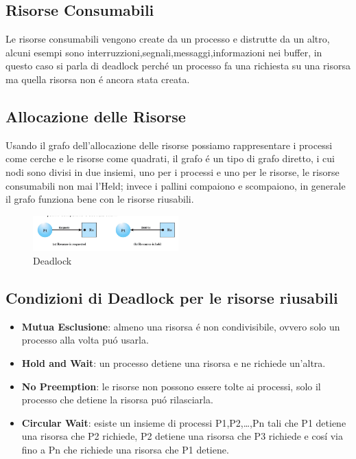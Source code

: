 \subsection{Risorse Consumabili}
Le risorse consumabili vengono create da un processo e distrutte da un altro, alcuni esempi sono interruzzioni,segnali,messaggi,informazioni nei
buffer, in questo caso si parla di deadlock perché un processo fa una richiesta su una risorsa ma quella risorsa non é ancora
stata creata.
\subsection{Allocazione delle Risorse}
Usando il grafo dell'allocazione delle risorse possiamo rappresentare i processi come cerche e le risorse come quadrati, il
grafo é un tipo di grafo diretto, i cui nodi sono divisi in due insiemi, uno per i processi e uno per le risorse, le risorse consumabili non mai
l'Held; invece i pallini compaiono e scompaiono, in generale il grafo funziona bene con le risorse riusabili.
\begin{figure}[H]
    \centering
    \includegraphics[width=0.5\textwidth]{immagini/GrafoAllocazioneDelleRisorse}
    \caption{Deadlock}
\end{figure}

\subsection{Condizioni di Deadlock per le risorse riusabili}
\begin{itemize}
    \item \textbf{Mutua Esclusione}: almeno una risorsa é non condivisibile, ovvero solo un processo alla volta puó usarla.
    \item \textbf{Hold and Wait}: un processo detiene una risorsa e ne richiede un'altra.
    \item \textbf{No Preemption}: le risorse non possono essere tolte ai processi, solo il processo che detiene la risorsa puó rilasciarla.
    \item \textbf{Circular Wait}: esiste un insieme di processi P1,P2,\dots,Pn tali che P1 detiene una risorsa che P2 richiede, P2 detiene una risorsa che P3 richiede e cosí via fino a Pn che richiede una risorsa che P1 detiene.
\end{itemize}
